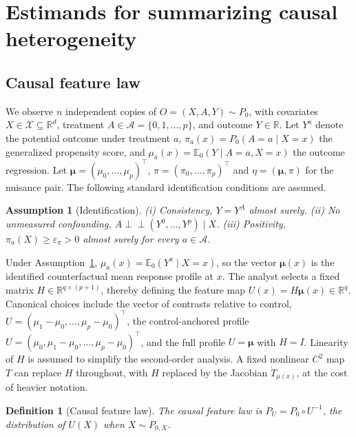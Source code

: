 \documentclass[11pt]{article}
\newtheorem{assumption}{Assumption}
\newtheorem{definition}{Definition}
\newcommand{\E}{\mathbb E}
\newcommand{\R}{\mathbb R}
\newcommand{\calA}{\mathcal A}
\newcommand{\calX}{\mathcal X}
\newcommand{\bmu}{\bm\mu}
\newcommand{\eps}{\varepsilon}
\begin{document}
\section{Estimands for summarizing causal heterogeneity}\label{sec:estimands}

\subsection{Causal feature law}\label{sec:setup}
We observe $n$ independent copies of $O=(X,A,Y)\sim P_0$, with covariates $X\in\calX\subseteq\R^d$, treatment $A\in\calA=\{0,1,\dots,p\}$, and outcome $Y\in\R$. Let $Y^a$ denote the potential outcome under treatment $a$, $\pi_a(x)=P_0(A=a\mid X=x)$ the generalized propensity score, and $\mu_a(x)=\E_0(Y\mid A=a,X=x)$ the outcome regression. Let $\bmu=(\mu_0,\dots,\mu_p)^\top$, $\pi=(\pi_0,\dots,\pi_p)^\top$ and $\eta=(\bmu,\pi)$ for the nuisance pair. The following standard identification conditions are assumed.

\begin{assumption}[Identification]\label{ass:ident}
(i) Consistency, $Y=Y^A$ almost surely. (ii) No unmeasured confounding, $A\perp\!\!\!\perp(Y^0,\dots,Y^p)\mid X$. (iii) Positivity, $\pi_a(X)\ge\eps_\pi>0$ almost surely for every $a\in\calA$.
\end{assumption}

Under Assumption~\ref{ass:ident}, $\mu_a(x)=\E_0(Y^a\mid X=x)$, so the vector $\bmu(x)$ is the identified counterfactual mean response profile at $x$. The analyst selects a fixed matrix $H\in\R^{q\times(p+1)}$, thereby defining the
feature map $U(x)=H\bmu(x)\in\R^q$.
Canonical choices include the vector of contrasts relative to control, $U=(\mu_1-\mu_0,\dots,\mu_p-\mu_0)^\top$, the control-anchored profile $U=(\mu_0,\mu_1-\mu_0,\dots,\mu_p-\mu_0)^\top$, and the full profile $U=\bmu$ with $H=I$. Linearity of $H$ is assumed to simplify the second-order analysis. A fixed nonlinear $C^2$ map $T$ can replace $H$ throughout, with $H$ replaced by the Jacobian $\dot T_{\mu(x)}$, at the cost of heavier notation.

\begin{definition}[Causal feature law]\label{def:featurelaw}
The causal feature law is $P_U=P_0\circ U^{-1}$, the distribution of $U(X)$ when $X\sim P_{0,X}$.
\end{definition}
\end{document}
